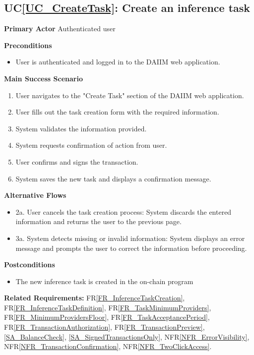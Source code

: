 \documentclass[12pt]{article}
\newcounter{ucnum} %
\newcommand{\ucref}[1]{UC\ref{#1}}
\newcommand{\rref}[1]{FR\ref{#1}}
\newcommand{\nfrref}[1]{NFR\ref{#1}}
\begin{document}
 \label{UC_CreateTask}
\subsection{\ucref{UC_CreateTask}: Create an inference task}

\textbf{Primary Actor}
Authenticated user

\textbf{Preconditions}
\begin{itemize}
\item User is authenticated and logged in to the DAIIM web application.
\end{itemize}

\textbf{Main Success Scenario}
\begin{enumerate}
\item User navigates to the "Create Task" section of the DAIIM web application.
\item User fills out the task creation form with the required information.
\item System validates the information provided.
\item System requests confirmation of action from user.
\item User confirms and signs the transaction.
\item System saves the new task and displays a confirmation message.
\end{enumerate}

\textbf{Alternative Flows}
\begin{itemize}
\item 2a. User cancels the task creation process: System discards the entered information and returns the user to the previous page.
\item 3a. System detects missing or invalid information: System displays an error message and prompts the user to correct the information before proceeding.
\end{itemize}

\textbf{Postconditions}
\begin{itemize}
\item The new inference task is created in the on-chain program
\end{itemize}

\textbf{Related Requirements:} \rref{FR_InferenceTaskCreation}, \rref{FR_InferenceTaskDefinition}, \rref{FR_TaskMinimumProviders}, \rref{FR_MinimumProvidersFloor}, \rref{FR_TaskAcceptancePeriod}, \rref{FR_TransactionAuthorization}, \rref{FR_TransactionPreview}, \ref{SA_BalanceCheck}, \ref{SA_SignedTransactionsOnly}, \nfrref{NFR_ErrorVisibility}, \nfrref{NFR_TransactionConfirmation}, \nfrref{NFR_TwoClickAccess}.
\end{document}
